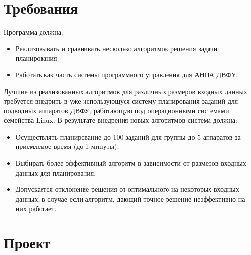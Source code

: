 \documentclass[a4paper,14pt,russian]{article}
\begin{document}
\section{Требования}



Программа должна:
\begin{itemize}
\item Реализовывать и сравнивать несколько алгоритмов решения задачи планирования
\item Работать как часть системы программного управления для АНПА ДВФУ.
\end{itemize}

Лучшие из реализованных алгоритмов для различных размеров входных данных требуется внедрить в уже использующуся систему планирования заданий для подводных аппаратов ДВФУ, работающую под операционными системами семейства Linux. В результате внедрения новых алгоритмов система должна:
\begin{itemize}

\item Осуществлять планирование до 100 заданий для группы до 5 аппаратов за приемлемое время (до 1 минуты).
\item Выбирать более эффективный алгоритм в зависимости от размеров входных данных для планирования.
\item Допускается отклонение решения от оптимального на некоторых входных данных, в случае если алгоритм, дающий точное решение неэффективно на них работает.
\end{itemize}

\section{Проект}
\end{document}
